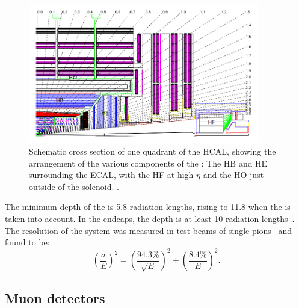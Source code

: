 \begin{figure}[h]
\centering
\includegraphics[width=0.9\textwidth]{detectorFigures/cms_hcal.png}
\caption{Schematic cross section of one quadrant of the HCAL, showing the arrangement of the various components of the \subdetector: The HB and HE surrounding the ECAL, with the HF at high $\eta$ and the HO just outside of the solenoid. \cite{CMSatLHC}.}
\label{fig:hcal}
\end{figure}

The minimum depth of the \HB is 5.8 radiation lengths, rising to 11.8 when the \HO is taken into account. In the endcaps, the depth is at least 10 radiation lengths~\cite{cmsHcal}. The resolution of the \HCAL system was measured in test beams of single pions~\cite{Abdullin:2009zz} and found to be:
\begin{equation}
\label{eq:HCALresol}
\left( \frac{\sigma}{E}\right) ^2= \left( \frac{94.3\%}{\sqrt{E}} \right)^2 + \left( \frac{8.4\%}{E} \right)^2.
\end{equation}

\subsection{Muon detectors}
\label{sec:cms:muondetector}

